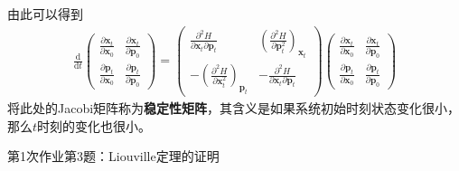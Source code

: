     由此可以得到
    \begin{align*}
        \frac {\mathrm{d}}{\mathrm{d}t}
        \begin{pmatrix}
            \frac {\partial \bm{x}_t}{\partial \bm{x}_0} & \frac {\partial \bm{x}_t}{\partial \bm{p}_0}\\
            \frac {\partial \bm{p}_t}{\partial \bm{x}_0} & \frac {\partial \bm{p}_t}{\partial \bm{p}_0}
        \end{pmatrix}
        =
        \begin{pmatrix}
            \frac {\partial^2 H}{\partial \bm{x}_t \partial \bm{p}_t} & (\frac {\partial^2 H}{\partial \bm{p}_t^2})_{\bm{x}_t}\\
            -(\frac {\partial^2 H}{\partial \bm{x}_t^2})_{\bm{p}_t} & - \frac {\partial^2 H}{\partial \bm{x}_t \partial \bm{p}_t}
        \end{pmatrix}
        \begin{pmatrix}
            \frac {\partial \bm{x}_t}{\partial \bm{x}_0} & \frac {\partial \bm{x}_t}{\partial \bm{p}_0}\\
            \frac {\partial \bm{p}_t}{\partial \bm{x}_0} & \frac {\partial \bm{p}_t}{\partial \bm{p}_0}
        \end{pmatrix}
    \end{align*}
    将此处的Jacobi矩阵称为\textbf{稳定性矩阵}，其含义是如果系统初始时刻状态变化很小，那么$t$时刻的变化也很小。
    \begin{asg}
        第1次作业第3题：Liouville定理的证明
    \end{asg}

